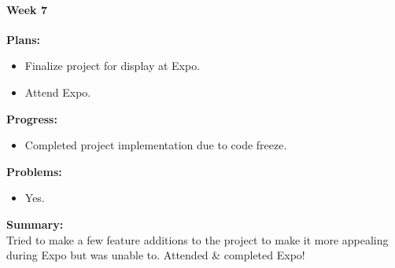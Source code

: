 \paragraph{Week 7}
\begin{adjustwidth}{2.5em}{0pt}
    \vspace{-0.5cm}\textbf{Plans:}
    \vspace{-0.5cm}
    \begin{itemize}
        \item Finalize project for display at Expo.
		\item Attend Expo.
    \end{itemize} 
    \vspace{-0.3cm}\textbf{Progress:}
    \vspace{-0.5cm}
    \begin{itemize}
        \item Completed project implementation due to code freeze.
    \end{itemize} 
    \vspace{-0.3cm}\textbf{Problems:}
    \vspace{-0.5cm}
    \begin{itemize}
        \item Yes.
    \end{itemize}  
    \vspace{-0.3cm}\noindent\textbf{Summary:}\\
    \noindent Tried to make a few feature additions to the project to make it more appealing during Expo but was unable to. Attended \& completed Expo! 
\end{adjustwidth}